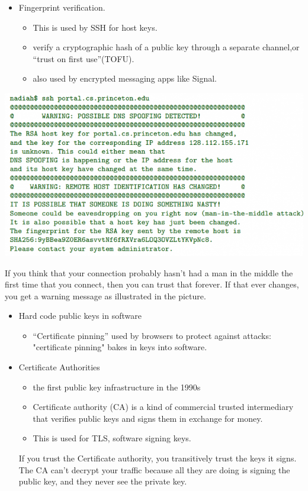 \documentclass[11pt]{article} %
\begin{document}
{\begin{itemize}
  \item Fingerprint verification.
  \begin{itemize}\item This is used by SSH for host keys.  \item verify a cryptographic hash of a public key through a separate channel,or “trust on first use”(TOFU). 


  \item also used by encrypted messaging apps like Signal.


  \end{itemize}
\end{itemize}

\includegraphics[scale=0.65]{./Trust-in-keys1.png}

  If you think that your connection probably hasn't had a man in the middle the first time that you connect, then you can trust that forever. If that ever changes, you get a warning message as illustrated in the picture.

\begin{itemize}
  \item Hard code public keys in software
  \begin{itemize}\item “Certificate pinning” used by browsers to protect against attacks: "certificate pinning" bakes in keys into software.
 
  \end{itemize}
\end{itemize}

\begin{itemize}
  \item Certificate Authorities
  \begin{itemize}\item the first public key infrastructure in the 1990s
  \item Certificate authority (CA) is  a kind of commercial trusted intermediary that verifies public keys and signs them in exchange for money. 
  \item This is used for TLS, software signing keys. 
  \end{itemize}
    If you trust the Certificate authority, you transitively trust the keys it signs. The CA can't decrypt your traffic because all they are doing is signing the public key, and they never see the private key.
\end{itemize}


}
\end{document}
